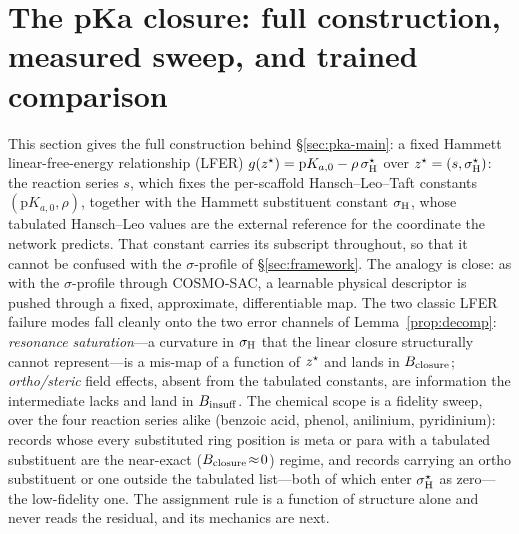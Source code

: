 \section{The pKa closure: full construction, measured sweep, and trained comparison}
\label{sec:si-pka}
\label{sec:pka}
This section gives the full construction behind \S\ref{sec:pka-main}: a fixed
Hammett linear-free-energy relationship (LFER) $g(z^\star)=\mathrm pK_{a,0}-\rho\,\sigma_{\mathrm H}^\star$ over
$z^\star=(s,\sigma_{\mathrm H}^\star)$: the reaction series $s$, which fixes the per-scaffold Hansch--Leo--Taft
constants $(\mathrm pK_{a,0},\rho)$, together with the Hammett substituent constant $\sigma_{\mathrm H}$, whose
tabulated Hansch--Leo values are the external reference for the coordinate the network predicts.
That constant carries its subscript throughout, so that it cannot be confused with the
$\sigma$-profile of \S\ref{sec:framework}. The analogy is close: as with the $\sigma$-profile through COSMO-SAC, a
learnable physical descriptor is pushed through a fixed, approximate, differentiable map. The two
classic LFER failure modes fall cleanly onto the two error channels of Lemma~\ref{prop:decomp}:
\emph{resonance saturation}---a curvature in $\sigma_{\mathrm H}$ that the linear closure structurally cannot
represent---is a mis-map of a function of $z^\star$ and lands in $B_{\mathrm{closure}}$; \emph{ortho/steric} field
effects, absent from the tabulated constants, are information the intermediate lacks and land in
$B_{\mathrm{insuff}}$. The chemical scope is a fidelity sweep, over the four reaction series alike (benzoic acid,
phenol, anilinium, pyridinium): records whose every substituted ring position is meta or para with a
tabulated substituent are the near-exact ($B_{\mathrm{closure}}\!\approx\!0$) regime, and records carrying an ortho
substituent or one outside the tabulated list---both of which enter $\sigma_{\mathrm H}^\star$ as zero---the
low-fidelity one. The assignment rule is a function of structure alone and never reads the residual,
and its mechanics are next.


